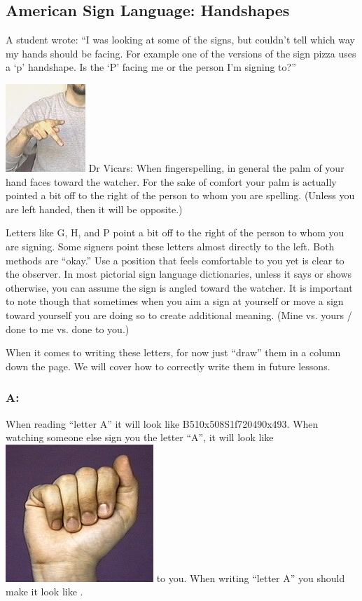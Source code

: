 \documentclass{article}
\begin{document}
\subsection{American Sign Language: Handshapes}

A student wrote:
``I was looking at some of the signs, but couldn't tell which way my hands should be facing.
For example one of the versions of the sign pizza uses a `p' handshape.
Is the `P' facing me or the person I'm signing to?''

\includegraphics[scale=0.5]{images/handsh1.jpg}
Dr Vicars:
When fingerspelling, in general the palm of your hand faces toward the watcher.
For the sake of comfort your palm is actually pointed a bit off to the right of the person to whom you are spelling.
(Unless you are left handed, then it will be opposite.)

Letters like G, H, and P point a bit off to the right of the person to whom you are signing.
Some signers point these letters almost directly to the left.
Both methods are ``okay.''
Use a position that feels comfortable to you yet is clear to the observer.
In most pictorial sign language dictionaries, unless it says or shows otherwise, you can assume the sign is angled toward the watcher.
It is important to note though that sometimes when you aim a sign at yourself or move a sign toward yourself you are doing so to create additional meaning.
(Mine vs. yours / done to me vs. done to you.)

When it comes to writing these letters, for now just ``draw'' them in a column down the page.
We will cover how to correctly write them in future lessons.

\subsubsection{A:}

When reading ``letter A'' it will look like B510x508S1f720490x493.
When watching someone else sign you the letter ``A'', it will look like \includegraphics[scale=0.5]{images/a.jpg} to you.
When writing ``letter A'' you should make it look like .
\end{document}
